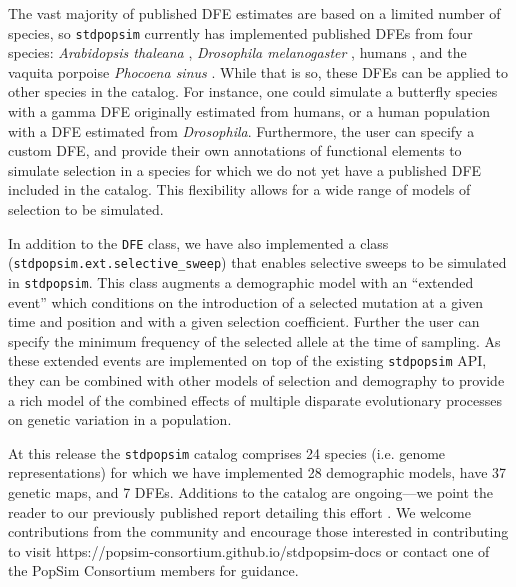 \documentclass[hidelinks]{article}
\newcommand{\stdpopsim}{\texttt{stdpopsim}\xspace}
\begin{document}
    The vast majority of published DFE estimates are based on a limited number of species,
    so \stdpopsim currently has implemented published DFEs from
    four species: \textit{Arabidopsis thaleana} \citep{huber2018gene}, \textit{Drosophila melanogaster} \citep{ragsdale2016triallelic,huber2017determining},
    humans \citep{huber2017determining,kim2017inference}, and the vaquita porpoise \textit{Phocoena sinus} \citep{robinson2022critically}.
    While that is so, these DFEs can be applied to other species
    in the catalog. For instance, one could simulate a butterfly species with a gamma DFE originally
    estimated from humans, or a human population with a DFE estimated from \textit{Drosophila}.
    Furthermore, the user can specify a custom DFE, and provide their own annotations
    of functional elements to simulate selection in a species for which we do not yet have 
    a published DFE included in the catalog. This flexibility allows for a wide range of
    models of selection to be simulated. %
   
    In addition to the \texttt{DFE} class, we have also implemented a class (\texttt{stdpopsim.ext.selective\_sweep})
    that enables selective sweeps to be simulated in \stdpopsim.
    This class augments a demographic model with an ``extended event''
    which conditions on the introduction of a selected mutation at a given time and position
    and with a given selection coefficient. Further the user can specify the minimum frequency
    of the selected allele at the time of sampling. As these extended events are implemented
    on top of the existing \stdpopsim API, they can be combined with other models of selection
    and demography to provide a rich model of the combined effects of multiple disparate evolutionary processes
    on genetic variation in a population.
    

    At this release the \stdpopsim catalog comprises 24 species (i.e. genome representations)
    for which we have implemented 28 demographic models, have 37 genetic maps, and 7 DFEs. %
    Additions to the catalog are ongoing---we point the reader to our previously published 
    report detailing this effort \citep{lauterbur2023expanding}. We welcome contributions from the
    community and encourage those interested in contributing to visit https://popsim-consortium.github.io/stdpopsim-docs
    or contact one of the PopSim Consortium members for guidance.
\end{document}
